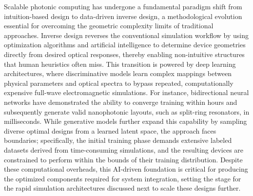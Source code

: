 \documentclass[11pt]{article}
\begin{document}
Scalable photonic computing has undergone a fundamental paradigm shift from intuition-based design to data-driven inverse design, a methodological evolution essential for overcoming the geometric complexity limits of traditional approaches. Inverse design reverses the conventional simulation workflow by using optimization algorithms and artificial intelligence to determine device geometries directly from desired optical responses, thereby enabling non-intuitive structures that human heuristics often miss. \citep{doi_10_1117_12_3066105_d6297c38} \citep{doi_10_48550_arxiv_2506_18627_e2696034} This transition is powered by deep learning architectures, where discriminative models learn complex mappings between physical parameters and optical spectra to bypass repeated, computationally expensive full-wave electromagnetic simulations. For instance, bidirectional neural networks have demonstrated the ability to converge training within hours and subsequently generate valid nanophotonic layouts, such as split-ring resonators, in milliseconds. While generative models further expand this capability by sampling diverse optimal designs from a learned latent space, the approach faces boundaries; specifically, the initial training phase demands extensive labeled datasets derived from time-consuming simulations, and the resulting devices are constrained to perform within the bounds of their training distribution. Despite these computational overheads, this AI-driven foundation is critical for producing the optimized components required for system integration, setting the stage for the rapid simulation architectures discussed next to scale these designs further. \citep{doi_10_1515_nanoph_2021_0660_2d91a441} \citep{doi_10_1515_nanoph_2024_0536_4b6631ba}
\end{document}
